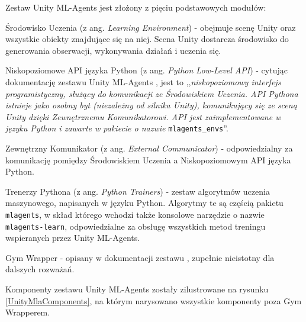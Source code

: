 Zestaw Unity ML-Agents jest złożony z pięciu podstawowych modułów:
\begin{enumerate*}
\item Środowisko Uczenia (z ang. \textit{Learning Environment}) - obejmuje scenę Unity oraz wszystkie obiekty znajdujące się na niej. Scena Unity dostarcza środowisko do generowania obserwacji, wykonywania działań i uczenia się.
\item Niskopoziomowe API języka Python (z ang. \textit{Python Low-Level API}) \cite{unitymla:pythonapi} - cytując dokumentację zestawu Unity ML-Agents \cite{unitymla:overview}, jest to ,,\textit{niskopoziomowy interfejs programistyczny, służący do komunikacji ze Środowiskiem Uczenia. API Pythona istnieje jako osobny byt (niezależny od silnika Unity), komunikujący się ze sceną Unity dzięki Zewnętrznemu Komunikatorowi. API jest zaimplementowane w języku Python i zawarte w pakiecie o nazwie} \texttt{mlagents\_envs}''.
\item Zewnętrzny Komunikator (z ang. \textit{External Communicator}) - odpowiedzialny za komunikację pomiędzy Środowiskiem Uczenia a Niskopoziomowym API języka Python.
\item Trenerzy Pythona (z ang. \textit{Python Trainers}) - zestaw algorytmów uczenia maszynowego, napisanych w języku Python. Algorytmy te są częścią pakietu \texttt{mlagents}, w skład którego wchodzi także konsolowe narzędzie o nazwie \texttt{mlagents-learn}, odpowiedzialne za obsługę wszystkich metod treningu wspieranych przez Unity ML-Agents.
\item Gym Wrapper - opisany w dokumentacji zestawu \cite{unitymla:gymWrapper}, zupełnie nieistotny dla dalszych rozważań.
\end{enumerate*}

Komponenty zestawu Unity ML-Agents zostały zilustrowane na rysunku \ref{UnityMlaComponents}, na którym narysowano wszystkie komponenty poza Gym Wrapperem.

